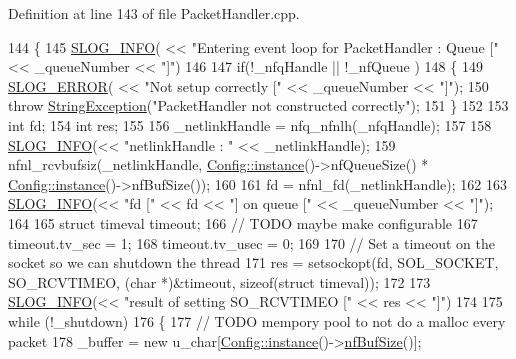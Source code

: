 Definition at line 143 of file Packet\-Handler.\-cpp.


\begin{DoxyCode}
144 \{
145     \hyperlink{_logger_8h_a119c1c29ba35a8db38e2358e41167282}{SLOG\_INFO}( << \textcolor{stringliteral}{"Entering event loop for PacketHandler : Queue ["} << \_queueNumber << \textcolor{stringliteral}{"]"})
146 
147     if(!\_nfqHandle || !\_nfQueue )
148     \{
149         \hyperlink{_logger_8h_a2a8694cd392d18f4db6b9cc9f15bafe3}{SLOG\_ERROR}( << \textcolor{stringliteral}{"Not setup correctly ["} << \_queueNumber << \textcolor{stringliteral}{"]"});
150         \textcolor{keywordflow}{throw} \hyperlink{class_vsid_common_1_1_string_exception}{StringException}(\textcolor{stringliteral}{"PacketHandler not constructed correctly"});
151     \}
152 
153     \textcolor{keywordtype}{int} fd; 
154     \textcolor{keywordtype}{int} res;
155     
156     \_netlinkHandle = nfq\_nfnlh(\_nfqHandle);
157 
158     \hyperlink{_logger_8h_a119c1c29ba35a8db38e2358e41167282}{SLOG\_INFO}(<< \textcolor{stringliteral}{"netlinkHandle : "} << \_netlinkHandle);
159     nfnl\_rcvbufsiz(\_netlinkHandle, \hyperlink{class_vsid_netfilter_1_1_config_abf1d4539011ef83cac0fef2ac864a3a9}{Config::instance}()->nfQueueSize() * 
      \hyperlink{class_vsid_netfilter_1_1_config_abf1d4539011ef83cac0fef2ac864a3a9}{Config::instance}()->nfBufSize());
160 
161     fd = nfnl\_fd(\_netlinkHandle);
162 
163     \hyperlink{_logger_8h_a119c1c29ba35a8db38e2358e41167282}{SLOG\_INFO}(<< \textcolor{stringliteral}{"fd ["} << fd << \textcolor{stringliteral}{"] on queue ["} << \_queueNumber << \textcolor{stringliteral}{"]"});
164 
165     \textcolor{keyword}{struct }timeval timeout;
166     \textcolor{comment}{// TODO maybe make configurable}
167     timeout.tv\_sec = 1; 
168     timeout.tv\_usec = 0; 
169 
170     \textcolor{comment}{// Set a timeout on the socket so we can shutdown the thread}
171     res = setsockopt(fd, SOL\_SOCKET, SO\_RCVTIMEO, (\textcolor{keywordtype}{char} *)&timeout, \textcolor{keyword}{sizeof}(\textcolor{keyword}{struct} timeval));
172 
173     \hyperlink{_logger_8h_a119c1c29ba35a8db38e2358e41167282}{SLOG\_INFO}(<< \textcolor{stringliteral}{"result of setting SO\_RCVTIMEO ["} << res << \textcolor{stringliteral}{"]"})
174 
175     while (!\_shutdown) 
176     \{
177         \textcolor{comment}{// TODO mempory pool to not do a malloc every packet}
178         \_buffer = \textcolor{keyword}{new} u\_char[\hyperlink{class_vsid_netfilter_1_1_config_abf1d4539011ef83cac0fef2ac864a3a9}{Config::instance}()->\hyperlink{class_vsid_netfilter_1_1_config_a6873a15c546f7178ac6a66c06166c840}{nfBufSize}()];

\end{DoxyCode}

